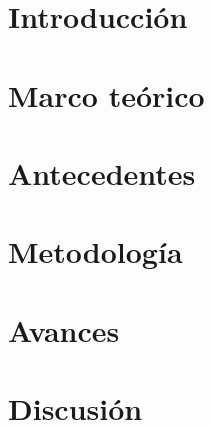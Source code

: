 \documentclass[12pt,letterpaper]{report}
\begin{document}


\tableofcontents
\newpage
{}

\chapter{Introducción}


%
%
%

\chapter{Marco teórico}


\chapter{Antecedentes}


%
%
%

\chapter{Metodología}


\chapter{Avances}


\chapter{Discusión}


\renewcommand{\bibname}{Referencias}


\end{document}
